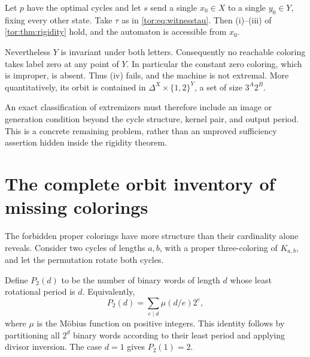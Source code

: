 \documentclass[11pt,a4paper]{article}
\numberwithin{equation}{section}
\theoremstyle{definition}
\theoremstyle{remark}
\newcommand{\D}{\Delta}
\begin{document}
\begin{example}\label{tor:ex:nonsufficient}
Let $p$ have the optimal cycles and let $s$ send a single $x_0\in X$ to a
single $y_0\in Y$, fixing every other state. Take $\tau$ as in
\eqref{tor:eq:witnesstau}. Then (i)--(iii) of \cref{tor:thm:rigidity} hold,
and the automaton is accessible from $x_0$.

Nevertheless $Y$ is invariant under both letters. Consequently no reachable
coloring takes label zero at any point of $Y$. In particular the constant zero
coloring, which is improper, is absent. Thus (iv) fails, and the machine is
not extremal. More quantitatively, its orbit is contained in
$\D^X\times\{1,2\}^Y$, a set of size $3^A2^B$.
\end{example}

An exact classification of extremizers must therefore include an image or
generation condition beyond the cycle structure, kernel pair, and output
period. This is a concrete remaining problem, rather than an unproved
sufficiency assertion hidden inside the rigidity theorem.

\section{The complete orbit inventory of missing colorings}\label{tor:sec:inventory}

The forbidden proper colorings have more structure than their cardinality
alone reveals. Consider two cycles of lengths $a,b$, with a proper
three-coloring of $K_{a,b}$, and let the permutation rotate both cycles.

Define $P_2(d)$ to be the number of binary words of length $d$ whose least
rotational period is $d$. Equivalently,
\begin{equation}\label{tor:eq:primitive}
 P_2(d)=\sum_{e\mid d}\mu(d/e)2^e,
\end{equation}
where $\mu$ is the M\"obius function on positive integers. This identity
follows by partitioning all $2^d$ binary words according to their least
period and applying divisor inversion. The case $d=1$ gives $P_2(1)=2$.
\end{document}

